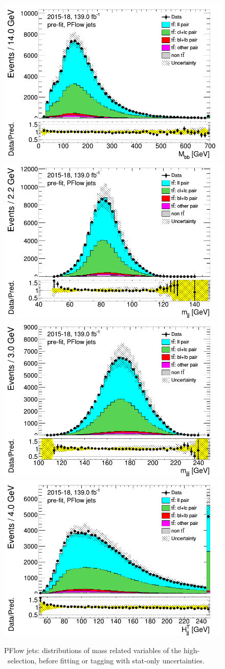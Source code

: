 \documentclass[letterpaper,12pt]{article}
\begin{document}
\newpage
\begin{figure}[H]
\includegraphics[width=.45\textwidth]{FTAG_plots/pretagNoRwnewonlyPFlowall/DataMC_h_Mbb.png}
\includegraphics[width=.45\textwidth]{FTAG_plots/pretagNoRwnewonlyPFlowall/DataMC_h_mjj.png}\\
\includegraphics[width=.45\textwidth]{FTAG_plots/pretagNoRwnewonlyPFlowall/DataMC_h_mjjj.png}
\includegraphics[width=.45\textwidth]{FTAG_plots/pretagNoRwnewonlyPFlowall/DataMC_h_Htjj.png}\\
\caption{PFlow jets: distributions of mass related variables of the high-\pt\ selection, 
before fitting or 
tagging with stat-only uncertainties.} \label{fig:highpT_mass_PFlow}
\end{figure}
\end{document}
